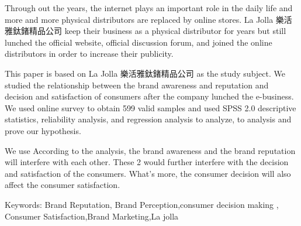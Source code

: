 Through out the years, the internet plays an important role in the daily life and more and more physical distributors are replaced by online stores. La Jolla 樂活雅鈦鍺精品公司 keep their business as a physical distributor for years but still lunched the official website, official discussion forum, and joined the online distributors in order to increase their publicity.


This paper is based on La Jolla 樂活雅鈦鍺精品公司 as the study subject. We studied the relationship between the brand awareness and reputation and decision and satisfaction of consumers after the company lunched the e-business. We used online survey to obtain 599 valid samples and used SPSS 2.0 descriptive statistics, reliability analysis, and regression analysis to analyze, to analysis and prove our hypothesis.

We use According to the analysis, the brand awareness and the brand reputation will interfere with each other. These 2 would further interfere with the decision and satisfaction of the consumers. What's more, the consumer decision will also affect the consumer satisfaction.

Keywords: Brand Reputation, Brand Perception,consumer decision making , Consumer Satisfaction,Brand Marketing,La jolla 